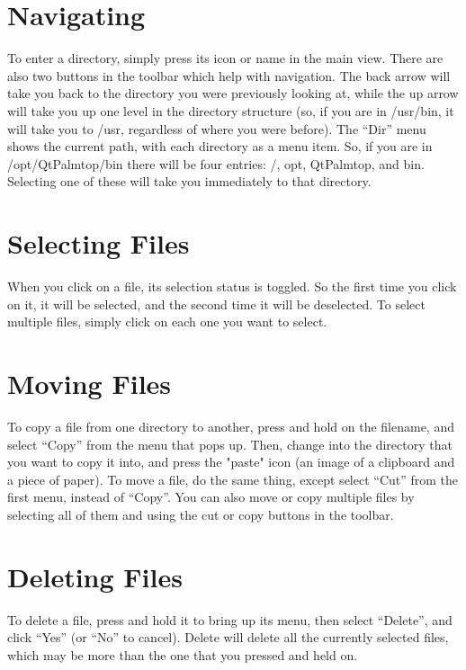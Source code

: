\documentclass[12pt,letterpaper,oneside, openany]{book} \usepackage[latin1] {inputenc}
\begin{document}
\section{Navigating}

To enter a directory, simply press its icon or name in the main view. There are also two buttons in the toolbar which help with navigation. The back arrow will take you back to the directory you were previously looking at, while the up arrow will take you up one level in the directory structure (so, if you are in /usr/bin, it will take you to /usr, regardless of where you were before). The ``Dir'' menu shows the current path, with each directory as a menu item. So, if you are in /opt/QtPalmtop/bin there will be four entries: /, opt, QtPalmtop, and bin. Selecting one of these will take you immediately to that directory. 

\section{Selecting Files}

When you click on a file, its selection status is toggled. So the first time you click on it, it will be selected, and the second time it will be deselected. To select multiple files, simply click on each one you want to select. 

\section{Moving Files}

To copy a file from one directory to another, press and hold on the filename, and select ``Copy'' from the menu that pops up. Then, change into the directory that you want to copy it into, and press the "paste" icon (an image of a clipboard and a piece of paper). To move a file, do the same thing, except select ``Cut'' from the first menu, instead of ``Copy''. You can also move or copy multiple files by selecting all of them and using the cut or copy buttons in the toolbar. 

\section{Deleting Files}

To delete a file, press and hold it to bring up its menu, then select ``Delete'', and click ``Yes'' (or ``No'' to cancel). Delete will delete all the currently selected files, which may be more than the one that you pressed and held on. 
\end{document}
